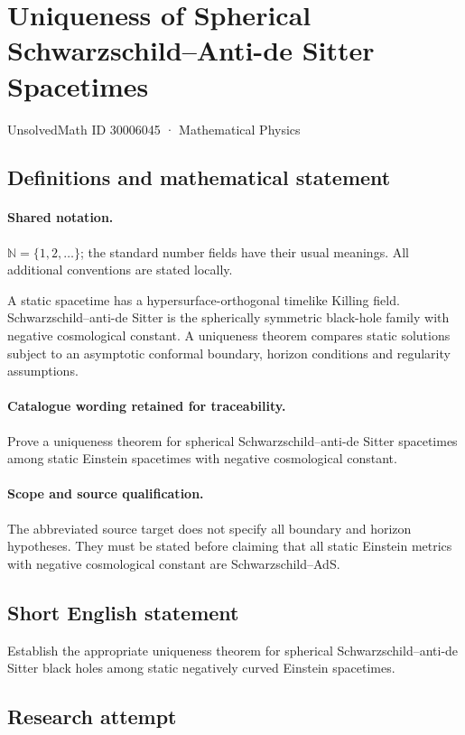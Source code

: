 \documentclass[11pt]{article}
\begin{document}
\setcounter{section}{30006044}
\section{Uniqueness of Spherical Schwarzschild–Anti-de Sitter Spacetimes}\label{30006045}
{\small UnsolvedMath ID 30006045 · Mathematical Physics}
\subsection{Definitions and mathematical statement}

\paragraph{Shared notation.}$\mathbb N=\{1,2,\ldots\}$; the standard number fields have their usual meanings. All additional conventions are stated locally.


A static spacetime has a hypersurface-orthogonal timelike Killing field. Schwarzschild--anti-de Sitter is the spherically symmetric black-hole family with negative cosmological constant. A uniqueness theorem compares static solutions subject to an asymptotic conformal boundary, horizon conditions and regularity assumptions.

\paragraph{Catalogue wording retained for traceability.}
Prove a uniqueness theorem for spherical Schwarzschild–anti-de Sitter spacetimes among static Einstein spacetimes with negative cosmological constant.

\paragraph{Scope and source qualification.}The abbreviated source target does not specify all boundary and horizon hypotheses. They must be stated before claiming that all static Einstein metrics with negative cosmological constant are Schwarzschild--AdS.
\subsection{Short English statement}
Establish the appropriate uniqueness theorem for spherical Schwarzschild--anti-de Sitter black holes among static negatively curved Einstein spacetimes.
\subsection{Research attempt}
\end{document}
